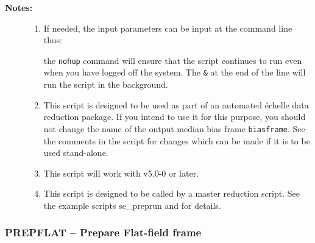 \documentclass[twoside,11pt]{starlink}
\providecommand{\scspec}[2]{#1}
\begin{document}
\begin{description}
\item [\textbf{Notes:}] \mbox{}
\begin{enumerate}

\item If needed, the input parameters can be input at the command
      line thus:

\begin{terminalv}
\end{terminalv}

      the \verb+nohup+ command will ensure that the script continues
      to run even when you have logged off the system.  The \verb+&+ at
      the end of the line will run the script in the background.

\item This script is designed to be used as part of an automated
      \'{e}chelle data reduction package.  If you intend to use it
      for this purpose, you should not change the name of the output
      median bias frame \verb+biasframe+.  See the comments in the script
      for changes which can be made if it is to be used stand-alone.

\item This script will work with  v5.0-0 or later.

\item This script is designed to be called by a master reduction
      script.  See the example scripts 
      {se_preprun}
      and  for details.

\end{enumerate}

\end{description}


\newpage
\subsubsection{\label{se_prepflat}PREPFLAT
               \scspec{--}{-} Prepare Flat-field frame}
\end{document}
